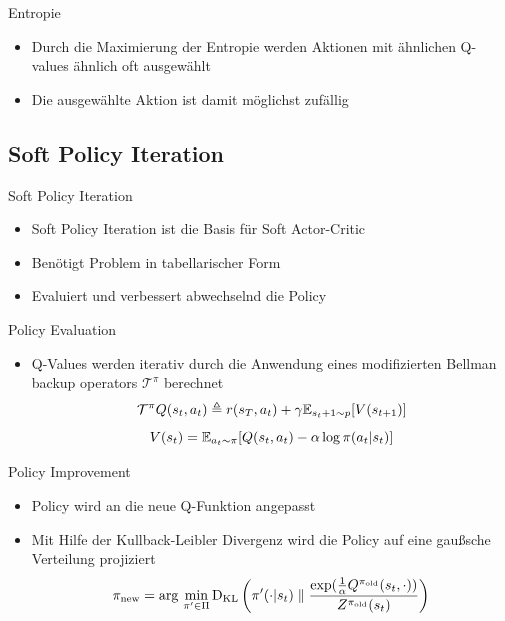 \begin{frame}{Entropie}
	\begin{itemize}
		
		\item Durch die Maximierung der Entropie werden Aktionen mit ähnlichen Q-values ähnlich oft ausgewählt
		\item Die ausgewählte Aktion ist damit möglichst zufällig
	\end{itemize} 
\end{frame}

\subsection{Soft Policy Iteration}
\begin{frame}{Soft Policy Iteration}
	\begin{itemize}
		\item Soft Policy Iteration ist die Basis für Soft Actor-Critic
		\item Benötigt Problem in tabellarischer Form
		\item Evaluiert und verbessert abwechselnd die Policy
	\end{itemize} 
\end{frame}

\begin{frame}{Policy Evaluation}
	\begin{itemize}
		\item Q-Values werden iterativ durch die Anwendung eines modifizierten Bellman backup operators $\mathcal{T}^\pi$ berechnet
		\begin{equation}
			\mathcal{T}^\pi \mathnormal{Q}(s_t,a_t) \triangleq \mathnormal{r}(s_T, a_t) + \gamma \mathbb{E}_{s_t+1\sim \mathnormal{p}}[\mathnormal{V}(s_{t+1})] \notag
		\end{equation}
		\begin{equation}
			\mathnormal{V}(s_{t}) = \mathbb{E}_{a_t \sim \pi}[\mathnormal{Q}(s_t, a_t) - \alpha \, \mathrm{log} \, \pi (a_t|s_t)] \notag
		\end{equation}
	\end{itemize}
\end{frame}

\begin{frame}{Policy Improvement}
	\begin{itemize}
		\item Policy wird an die neue Q-Funktion angepasst
		\item Mit Hilfe der Kullback-Leibler Divergenz wird die Policy auf eine gaußsche Verteilung projiziert
		\begin{equation}
			\pi_{\mathrm{new}} = \mathrm{arg} \, \min_{\pi^\prime \in \Pi} \mathrm{D_{KL}} \left( \pi^\prime(\cdot | s_t) \parallel \frac{\mathrm{exp} (\frac{1}{\alpha}\mathnormal{Q}^{\pi_{\mathrm{old}}}(s_t, \cdot))}{\mathnormal{Z}^{\pi_{\mathrm{old}}}(s_t)} \right) \notag
		\end{equation}
	\end{itemize} 
\end{frame}
